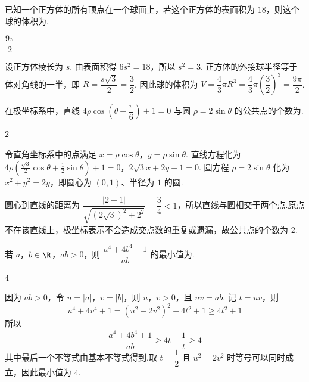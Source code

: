 \begin{problem}
已知一个正方体的所有顶点在一个球面上，若这个正方体的表面积为 \(18\)，则这个球的体积为\fillinblank{}.
\end{problem}

\begin{answer}
\(\dfrac{9\pi}{2}\)
\end{answer}

\begin{solution}
设正方体棱长为 \(s\). 由表面积得 \(6s^2=18\)，所以 \(s^2=3\). 正方体的外接球半径等于体对角线的一半，即
\(R=\dfrac{s\sqrt3}{2}=\dfrac32\). 因此球的体积为
\(V=\dfrac43\pi R^3=\dfrac43\pi\left(\dfrac32\right)^3=\dfrac{9\pi}{2}\).
\end{solution}

\begin{problem}
在极坐标系中，直线 \(4\rho\cos\left(\theta-\dfrac{\pi}{6}\right)+1=0\) 与圆 \(\rho=2\sin\theta\) 的公共点的个数为\fillinblank{}.
\end{problem}

\begin{answer}
\(2\)
\end{answer}

\begin{solution}
令直角坐标系中的点满足 \(x=\rho\cos\theta\)，\(y=\rho\sin\theta\). 直线方程化为
\(4\rho\left(\frac{\sqrt3}{2}\cos\theta+\frac12\sin\theta\right)+1=0\)，\(2\sqrt3x+2y+1=0\).
圆方程 \(\rho=2\sin\theta\) 化为 \(x^2+y^2=2y\)，即圆心为 \((0,1)\)、半径为 \(1\) 的圆.

圆心到直线的距离为 \(\dfrac{|2+1|}{\sqrt{(2\sqrt3)^2+2^2}}=\dfrac34<1\)，所以直线与圆相交于两个点.原点不在该直线上，极坐标表示不会造成交点数的重复或遗漏，故公共点的个数为 \(2\).
\end{solution}

\begin{problem}
若 \(a\)，\(b\in\R\)，\(ab>0\)，则 \(\dfrac{a^4+4b^4+1}{ab}\) 的最小值为\fillinblank{}.
\end{problem}

\begin{answer}
\(4\)
\end{answer}

\begin{solution}
因为 \(ab>0\)，令 \(u=|a|\)，\(v=|b|\)，则 \(u\)，\(v>0\)，且 \(uv=ab\). 记 \(t=uv\)，则
\[
u^4+4v^4+1=(u^2-2v^2)^2+4t^2+1\geq4t^2+1
\]
所以
\[
\frac{a^4+4b^4+1}{ab}\geq4t+\frac1t\geq4
\]
其中最后一个不等式由基本不等式得到.取 \(t=\dfrac12\) 且 \(u^2=2v^2\) 时等号可以同时成立，因此最小值为 \(4\).
\end{solution}

